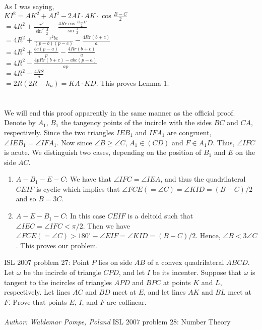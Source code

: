 As I was saying, \\
$ KI^2 = AK^2 + AI^2 - 2AI \cdot AK \cdot \cos{\frac {B - C}{2}}$ \\
$ = 4R^2 + \frac {r^2}{\sin^2{\frac {A}{2}}} - \frac {4Rr\cos{\frac {B - C}{2}}}{\sin{\frac {A}{2}}}$ \\
$ = 4R^2 + \frac {r^2bc}{(p - b)(p - c)} - \frac {4Rr(b + c)}{a}$ \\
$ = 4R^2 + \frac {bc(p - a)}{p} - \frac {4Rr(b + c)}{a}$ \\
$ = 4R^2 - \frac {4pRr(b + c) - abc(p - a)}{ap}$ \\
$ = 4R^2 - \frac {4RS}{a}$ \\
$ = 2R(2R - h_a) = KA \cdot KD$. This proves Lemma 1. \\\\\\
We will end this proof apparently in the same manner as the official proof. Denote by $ A_1$, $ B_1$ the tangency points of the incircle with the sides $ BC$ and $ CA$, respectively. Since the two triangles $ IEB_1$ and $ IFA_1$ are congruent, $ \angle{IEB_1} = \angle{IFA_1}$. Now since $ \angle{B} \geq \angle{C}$, $ A_1 \in (CD)$ and $ F \in A_1D$. Thus, $ \angle{IFC}$ is acute. We distinguish two cases, depending on the position of $ B_1$ and $ E$ on the side $ AC$.
\begin{enumerate}[(1)]
  \item $ A - B_1 - E - C$: We have that $ \angle{IFC} = \angle{IEA}$, and thus the quadrilateral $ CEIF$ is cyclic which implies that $ \angle{FCE}( = \angle{C}) = \angle{KID} = (B - C)/2$ and so $ B = 3C$.
  \item $ A - E - B_1 - C$: In this case $ CEIF$ is a deltoid such that $ \angle{IEC} = \angle{IFC} < \pi/2$. Then we have $ \angle{FCE}( = \angle{C}) > 180^{\circ} - \angle{EIF} = \angle{KID} = (B - C)/2$. Hence, $ \angle{B} < 3\angle{C}$. This proves our problem.
\end{enumerate} 
ISL 2007 problem 27:  Point $ P$ lies on side $ AB$ of a convex quadrilateral $ ABCD$. Let $ \omega$ be the incircle of triangle $ CPD$, and let $ I$ be its incenter. Suppose that $ \omega$ is tangent to the incircles of triangles $ APD$ and $ BPC$ at points $ K$ and $ L$, respectively. Let lines $ AC$ and $ BD$ meet at $ E$, and let lines $ AK$ and $ BL$ meet at $ F$. Prove that points $ E$, $ I$, and $ F$ are collinear. \\\\
\textit{Author: Waldemar Pompe, Poland} 
ISL 2007 problem 28:  Number Theory 
